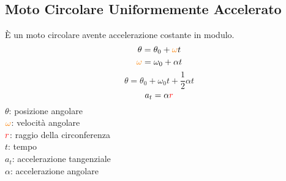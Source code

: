 \subsection{Moto Circolare Uniformemente Accelerato}\label{subsec:cinematica:mrua}
\label{subsec:mrua}
È un moto circolare avente accelerazione costante in modulo.
\begin{equation*}
\theta = \theta_0 + \mathcolor{orange}{\omega}t
\end{equation*}
\begin{equation*}
\mathcolor{orange}{\omega} = \omega_0 + \alpha t
\end{equation*}
\begin{equation*}
\theta = \theta_0 + \omega_0t + \frac{1}{2}\alpha t
\end{equation*}
\begin{equation*}
a_t = \alpha \mathcolor{red}{r}
\end{equation*}
$\theta$: posizione angolare\\
$\mathcolor{orange}{\omega}$: velocità angolare\\
$\mathcolor{red}{r}$: raggio della circonferenza\\
$t$: tempo\\
$a_t$: accelerazione tangenziale\\
$\alpha$: accelerazione angolare
